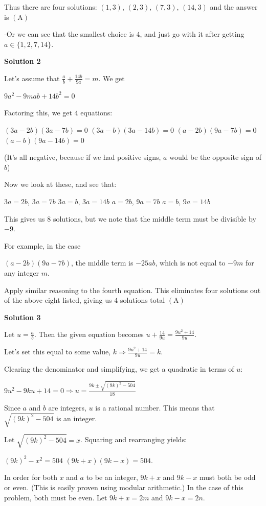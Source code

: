 \begin{enumerate}
 Thus there are four solutions: $(1,3)$, $(2,3)$, $(7,3)$, $(14,3)$ and the answer is $\mathrm{(A)}$

 -Or we can see that the smallest choice is $4$, and just go with it after getting $a\in\{1,2,7,14\}.$




\textbf{Solution 2}

Let's assume that $\frac{a}{b} + \frac{14b}{9a} = m$. We get

 $9a^2 - 9mab + 14b^2 = 0$

 Factoring this, we get $4$ equations:

 $(3a-2b)(3a-7b) = 0$
$(3a-b)(3a-14b) = 0$
$(a-2b)(9a-7b) = 0$
$(a-b)(9a-14b) = 0$

 (It's all negative, because if we had positive signs, $a$ would be the opposite sign of $b$)

 Now we look at these, and see that:

 $3a=2b$, $3a=7b$
$3a=b$, $3a=14b$
$a=2b$, $9a=7b$
$a=b$, $9a=14b$

 This gives us $8$ solutions, but we note that the middle term must be divisible by $-9$.

 For example, in the case 

 $(a-2b)(9a-7b)$, the middle term is $-25ab$, which is not equal to $-9m$ for any integer $m$.

 Apply similar reasoning to the fourth equation. This eliminates four solutions out of the above eight listed, giving us $4$ solutions total $\mathrm {(A)}$




\textbf{Solution 3}

Let $u = \frac{a}{b}$. Then the given equation becomes $u + \frac{14}{9u} = \frac{9u^2 + 14}{9u}$.

 Let's set this equal to some value, $k \Rightarrow \frac{9u^2 + 14}{9u} = k$.

 Clearing the denominator and simplifying, we get a quadratic in terms of $u$:

 $9u^2 - 9ku + 14 = 0 \Rightarrow u = \frac{9k \pm \sqrt{(9k)^2 - 504}}{18}$

 Since $a$ and $b$ are integers, $u$ is a rational number. This means that $\sqrt{(9k)^2 - 504}$ is an integer.

 Let $\sqrt{(9k)^2 - 504} = x$. Squaring and rearranging yields:

 $(9k)^2 - x^2 = 504$
$(9k+x)(9k-x) = 504$.

 In order for both $x$ and $a$ to be an integer, $9k + x$ and $9k - x$ must both be odd or even. (This is easily proven using modular arithmetic.) In the case of this problem, both must be even. Let $9k + x = 2m$ and $9k - x = 2n$.


\end{enumerate}
